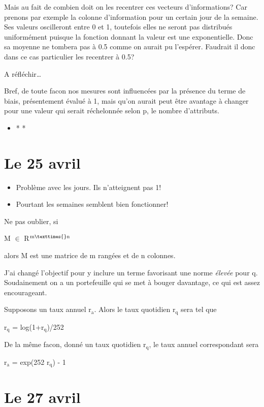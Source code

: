 \documentclass[11pt]{article}
\begin{document}
Mais au fait de combien doit on les recentrer ces vecteurs d'informations? Car prenons par
exemple la colonne d'information pour un certain jour de la semaine. Ses valeurs
oscilleront entre 0 et 1, toutefois elles ne seront pas distribués uniformément puisque la
fonction donnant la valeur est une exponentielle. Donc sa moyenne ne tombera pas à 0.5
comme on aurait pu l'espérer. Faudrait il donc dans ce cas particulier les recentrer à
0.5?

A réfléchir\ldots{}

Bref, de toute facon nos mesures sont influencées par la présence du terme de biais,
présentement évalué à 1, mais qu'on aurait peut être avantage à changer pour une valeur
qui serait réchelonnée selon p, le nombre d'attributs.


\begin{itemize}
\item * *
\end{itemize}


\section{\textbf{Le 25 avril}}
\label{sec-5}

\begin{itemize}
\item Problème avec les jours. Ils n'atteignent pas 1!
\item Pourtant les semaines semblent bien fonctionner!
\end{itemize}

Ne pas oublier, si 

M $\in$ R$^{\text{m}\texttimes{}\text{n}}$

alors M est une matrice de m rangées et de n colonnes.

J'ai changé l'objectif pour y inclure un terme favorisant une norme \emph{élevée} pour
q. Soudainement on a un portefeuille qui se met à bouger davantage, ce qui est assez
encourageant. 

Supposons un taux annuel r$_{\text{a}}$. Alors le taux quotidien r$_{\text{q}}$ sera tel que

r$_{\text{q}}$ = log(1+r$_{\text{q}}$)/252

De la même facon, donné un taux quotidien r$_{\text{q}}$, le taux annuel correspondant sera 

r$_{\text{a}}$ = exp(252 r$_{\text{q}}$) - 1


\section{\textbf{Le 27 avril}}
\label{sec-6}
\end{document}
